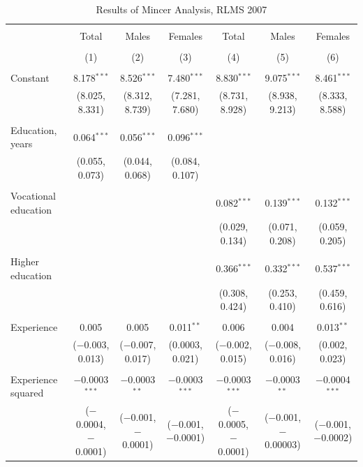\documentclass[alpha-refs]{wiley-article-01g}
\begin{document}
\begin{landscape}

\fontsize{9}{11}
\selectfont

\begin{table}[!htbp] \centering 
\renewcommand{\arraystretch}{1.0}
  \caption{Results of Mincer Analysis, RLMS 2007} 
  \label{} 
\begin{tabular}{@{\extracolsep{5pt}}lcccccc} 
\\[-1.8ex]\hline 
\hline \\[-1.8ex] 
 & Total & Males & Females & Total & Males & Females \\ 
\\[-1.8ex] & (1) & (2) & (3) & (4) & (5) & (6)\\ 
\hline \\[-1.8ex] 
 Constant & 8.178$^{***}$ & 8.526$^{***}$ & 7.480$^{***}$ & 8.830$^{***}$ & 9.075$^{***}$ & 8.461$^{***}$ \\ 
  & (8.025, 8.331) & (8.312, 8.739) & (7.281, 7.680) & (8.731, 8.928) & (8.938, 9.213) & (8.333, 8.588) \\ 
  & & & & & & \\ 
 Education, years & 0.064$^{***}$ & 0.056$^{***}$ & 0.096$^{***}$ &  &  &  \\ 
  & (0.055, 0.073) & (0.044, 0.068) & (0.084, 0.107) &  &  &  \\ 
  & & & & & & \\ 
 Vocational education &  &  &  & 0.082$^{***}$ & 0.139$^{***}$ & 0.132$^{***}$ \\ 
  &  &  &  & (0.029, 0.134) & (0.071, 0.208) & (0.059, 0.205) \\ 
  & & & & & & \\ 
 Higher education &  &  &  & 0.366$^{***}$ & 0.332$^{***}$ & 0.537$^{***}$ \\ 
  &  &  &  & (0.308, 0.424) & (0.253, 0.410) & (0.459, 0.616) \\ 
  & & & & & & \\ 
 Experience & 0.005 & 0.005 & 0.011$^{**}$ & 0.006 & 0.004 & 0.013$^{**}$ \\ 
  & ($-$0.003, 0.013) & ($-$0.007, 0.017) & (0.0003, 0.021) & ($-$0.002, 0.015) & ($-$0.008, 0.016) & (0.002, 0.023) \\ 
  & & & & & & \\ 
 Experience squared & $-$0.0003$^{***}$ & $-$0.0003$^{**}$ & $-$0.0003$^{***}$ & $-$0.0003$^{***}$ & $-$0.0003$^{**}$ & $-$0.0004$^{***}$ \\ 
  & ($-$0.0004, $-$0.0001) & ($-$0.001, $-$0.0001) & ($-$0.001, $-$0.0001) & ($-$0.0005, $-$0.0001) & ($-$0.001, $-$0.00003) & ($-$0.001, $-$0.0002) \\ 

\end{tabular}
\end{table}
\end{landscape}
\end{document}
